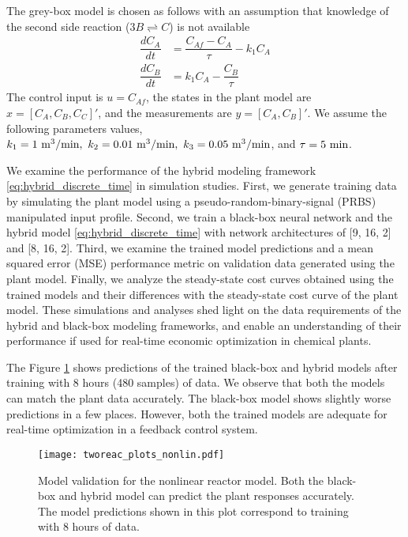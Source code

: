 \documentclass{article}
\begin{document}
The grey-box model is chosen as follows with an assumption that knowledge of the
second side reaction ($3B \rightleftharpoons C $) is not available
\begin{align*}
  \dfrac{dC_A}{dt} &= \dfrac{C_{Af} - C_A}{\tau} - k_1C_A\\
  \dfrac{dC_B}{dt} &= k_1C_A - \dfrac{C_B}{\tau}
\end{align*}
The control input is $u = C_{Af}$, the states in the plant model are $x = [C_A,
C_B, C_C]'$, and the measurements are $y = [C_A, C_B]'$. We assume the following
parameters values, $k_1 = 1 \ \textnormal{m}^3/\textnormal{min}, \ k_2 = 0.01 \
\textnormal{m}^3/\textnormal{min}, \ k_3 = 0.05 \
\textnormal{m}^3/\textnormal{min}$, and $\tau = 5 \ \textnormal{min}$.

We examine the performance of the hybrid modeling framework
\eqref{eq:hybrid_discrete_time} in simulation studies. First, we generate
training data by simulating the plant model using a pseudo-random-binary-signal
(PRBS) manipulated input profile. Second, we train a black-box neural network
and the hybrid model \eqref{eq:hybrid_discrete_time} with network architectures
of [9, 16, 2] and [8, 16, 2]. Third, we examine the trained model predictions
and a mean squared error (MSE) performance metric on validation data generated
using the plant model. Finally, we analyze the steady-state cost curves obtained
using the trained models and their differences with the steady-state cost curve
of the plant model. These simulations and analyses shed light on the data
requirements of the hybrid and black-box modeling frameworks, and enable an
understanding of their performance if used for real-time economic optimization
in chemical plants.

The Figure \ref{fig:validation_pred} shows predictions of the trained black-box
and hybrid models after training with 8 hours (480 samples) of data. We observe
that both the models can match the plant data accurately. The black-box model
shows slightly worse predictions in a few places. However, both the trained
models are adequate for real-time optimization in a feedback control system.

\begin{figure}[!h]
  \centering
  \texttt{[image: tworeac\_plots\_nonlin.pdf]}
  \caption{Model validation for the nonlinear reactor model. Both the black-box
           and hybrid model can predict the plant responses accurately. The
           model predictions shown in this plot correspond to training with 8
           hours of data.}
  \label{fig:validation_pred}
\end{figure}
\end{document}
